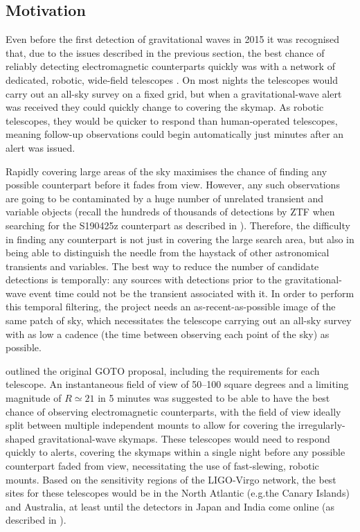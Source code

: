 \subsection{Motivation}
\label{sec:goto_motivation}
\begin{colsection}

Even before the first detection of gravitational waves in 2015 it was recognised that, due to the issues described in the previous section, the best chance of reliably detecting electromagnetic counterparts quickly was with a network of dedicated, robotic, wide-field telescopes \citep{Darren}. On most nights the telescopes would carry out an all-sky survey on a fixed grid, but when a gravitational-wave alert was received they could quickly change to covering the skymap. As robotic telescopes, they would be quicker to respond than human-operated telescopes, meaning follow-up observations could begin automatically just minutes after an alert was issued.

Rapidly covering large areas of the sky maximises the chance of finding any possible counterpart before it fades from view. However, any such observations are going to be contaminated by a huge number of unrelated transient and variable objects (recall the hundreds of thousands of detections by ZTF when searching for the S190425z counterpart as described in ). Therefore, the difficulty in finding any counterpart is not just in covering the large search area, but also in being able to distinguish the needle from the haystack of other astronomical transients and variables. The best way to reduce the number of candidate detections is temporally: any sources with detections prior to the gravitational-wave event time could not be the transient associated with it. In order to perform this temporal filtering, the project needs an as-recent-as-possible image of the same patch of sky, which necessitates the telescope carrying out an all-sky survey with as low a cadence (the time between observing each point of the sky) as possible.

\citet{Darren} outlined the original GOTO proposal, including the requirements for each telescope. An instantaneous field of view of 50--100 square degrees and a limiting magnitude of $R\simeq21$ in 5 minutes was suggested to be able to have the best chance of observing electromagnetic counterparts, with the field of view ideally split between multiple independent mounts to allow for covering the irregularly-shaped gravitational-wave skymaps. These telescopes would need to respond quickly to alerts, covering the skymaps within a single night before any possible counterpart faded from view, necessitating the use of fast-slewing, robotic mounts. Based on the sensitivity regions of the LIGO-Virgo network, the best sites for these telescopes would be in the North Atlantic (e.g.\@ the Canary Islands) and Australia, at least until the detectors in Japan and India come online (as described in ).


\end{colsection}
